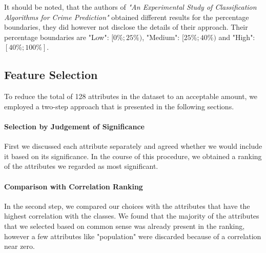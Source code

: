 It should be noted, that the authors of \textit{"An Experimental Study
of Classification Algorithms for Crime Prediction"} \cite{indian}
obtained different results for the percentage boundaries, they did
however not disclose the details of their approach.
Their percentage boundaries are "Low": \([0\%;25\%)\), "Medium": \([25\%; 40\%)\) and "High": \([40\%; 100\%]\).

\subsection{Feature Selection}
\label{sec:feature_selection}    

To reduce the total of 128 attributes in the dataset to an acceptable
amount, we employed a two-step approach that is presented in the
following sections.

\paragraph{Selection by Judgement of Significance}
First we discussed each attribute separately and agreed whether we
would include it based on its significance. In the course of this
procedure, we obtained a ranking of the attributes we regarded as most
significant.

\paragraph{Comparison with Correlation Ranking}
In the second step, we compared our choices with the attributes that
have the highest correlation with the classes. We found that the
majority of the attributes that we selected based on common sense was
already present in the ranking, however a few attributes like
"population" were discarded because of a correlation near zero.

